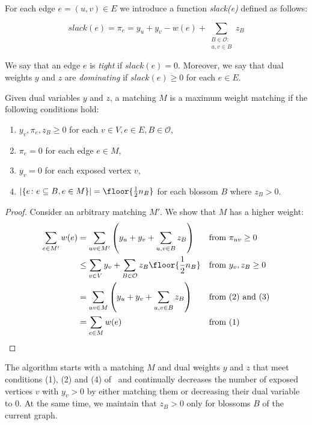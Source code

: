 \begin{defn}[slack]
    For each edge $e = (u, v) \in E$ we introduce a function \emph{slack(e)} defined as follows:

    \[slack(e) = \pi_e = y_u + y_v - w(e) + \sum_{\substack{B \in \mathcal{O}: \\ u, v \in B}} z_B\]
\end{defn}

We say that an edge $e$ is \emph{tight} if $slack(e) = 0$. Moreover, we say that dual weights $y$ and $z$ are \emph{dominating} if $slack(e) \geq 0$ for each $e \in E$.

\begin{theorem}\label{thm:conditions}
Given dual variables $y$ and $z$, a matching $M$ is a maximum weight matching if the following conditions hold:

\begin{enumerate}
    \renewcommand{\labelenumi}{(\arabic{enumi})}
    \item $y_v, \pi_{e}, z_B \geq 0$ for each $v \in V, e \in E, B \in \mathcal{O}$,
    \item $\pi_{e} = 0$ for each edge $e \in M$,
    \item $y_v = 0$ for each exposed vertex $v$,
    \item $|\{e \colon e \subseteq B, e \in M\}| = \floor{\frac{1}{2}n_B}$ for each blossom $B$ where $z_B > 0$.
\end{enumerate}

\begin{proof}
Consider an arbitrary matching $M'$. We show that $M$ has a higher weight:
\begin{align*}
    \sum_{e \in M'} w(e) &= \sum_{uv \in M'} \left( y_u + y_v + \sum_{u, v \in B} z_B \right) && \text{from } \pi_{uv} \geq 0 \\
    &\leq \sum_{v \in V} y_v + \sum_{B \in \mathcal{O}} z_B\floor{\frac{1}{2}n_B} && \text{from } y_v, z_B \geq 0 \\
    &= \sum_{uv \in M} \left( y_u + y_v + \sum_{u, v \in B} z_B \right) && \text{from (2) and (3)}\\
    &= \sum_{e \in M} w(e) && \text{from (1)}\\
\end{align*}
\end{proof}

\end{theorem}

The algorithm starts with a matching $M$ and dual weights $y$ and $z$ that meet conditions (1), (2) and (4) of~ and continually decreases the number of exposed vertices $v$ with $y_v > 0$ by either matching them or decreasing their dual variable to $0$. At the same time, we maintain that $z_B > 0$ only for blossoms $B$ of the current graph.

